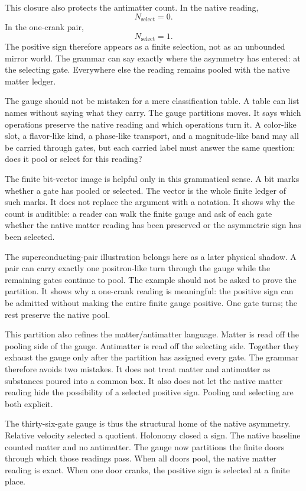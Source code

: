 This closure also protects the antimatter count. In the native reading,
\[
  N_{\mathrm{select}} = 0.
\]
In the one-crank pair,
\[
  N_{\mathrm{select}} = 1.
\]
The positive sign therefore appears as a finite selection, not as an
unbounded mirror world. The grammar can say exactly where the asymmetry has
entered: at the selecting gate. Everywhere else the reading remains pooled
with the native matter ledger.

The gauge should not be mistaken for a mere classification table. A table
can list names without saying what they carry. The gauge partitions moves.
It says which operations preserve the native reading and which operations
turn it. A color-like slot, a flavor-like kind, a phase-like transport, and
a magnitude-like band may all be carried through gates, but each carried
label must answer the same question: does it pool or select for this
reading?

The finite bit-vector image is helpful only in this grammatical sense. A bit
marks whether a gate has pooled or selected. The vector is the whole finite
ledger of such marks. It does not replace the argument with a notation. It
shows why the count is auditible: a reader can walk the finite gauge and ask
of each gate whether the native matter reading has been preserved or the
asymmetric sign has been selected.

The superconducting-pair illustration belongs here as a later physical
shadow. A pair can carry exactly one positron-like turn through the gauge
while the remaining gates continue to pool. The example should not be asked
to prove the partition. It shows why a one-crank reading is meaningful: the
positive sign can be admitted without making the entire finite gauge
positive. One gate turns; the rest preserve the native pool.

This partition also refines the matter/antimatter language. Matter is read
off the pooling side of the gauge. Antimatter is read off the selecting side.
Together they exhaust the gauge only after the partition has assigned every
gate. The grammar therefore avoids two mistakes. It does not treat matter
and antimatter as substances poured into a common box. It also does not let
the native matter reading hide the possibility of a selected positive sign.
Pooling and selecting are both explicit.

The thirty-six-gate gauge is thus the structural home of the native
asymmetry. Relative velocity selected a quotient. Holonomy closed a sign.
The native baseline counted matter and no antimatter. The gauge now
partitions the finite doors through which those readings pass. When all
doors pool, the native matter reading is exact. When one door cranks, the
positive sign is selected at a finite place.

